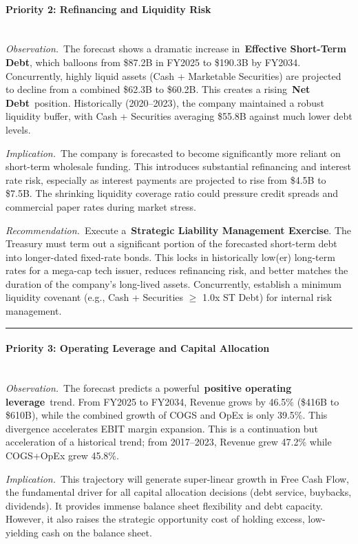 \documentclass[12pt,a4paper]{article}
\begin{document}
\begin{llmoutput}
\paragraph{Priority 2: Refinancing and Liquidity Risk}\mbox{}\\
\textit{Observation.}~The forecast shows a dramatic increase
in~\textbf{Effective Short-Term Debt}, which balloons from \$87.2B in
FY2025 to \$190.3B by FY2034. Concurrently, highly liquid assets (Cash +
Marketable Securities) are projected to decline from a combined \$62.3B
to \$60.2B. This creates a rising~\textbf{Net Debt}~position.
Historically (2020--2023), the company maintained a robust liquidity
buffer, with Cash + Securities averaging \$55.8B against much lower debt
levels.

\textit{Implication.}~The company is forecasted to become significantly
more reliant on short-term wholesale funding. This introduces
substantial refinancing and interest rate risk, especially as interest
payments are projected to rise from \$4.5B to \$7.5B. The shrinking
liquidity coverage ratio could pressure credit spreads and commercial
paper rates during market stress.

\textit{Recommendation.}~Execute a~\textbf{Strategic Liability
Management Exercise}. The Treasury must term out a significant portion
of the forecasted short-term debt into longer-dated fixed-rate bonds.
This locks in historically low(er) long-term rates for a mega-cap tech
issuer, reduces refinancing risk, and better matches the duration of the
company's long-lived assets. Concurrently, establish a
minimum liquidity covenant (e.g., Cash + Securities $\geq$ 1.0x ST Debt) for
internal risk management.

\noindent\rule{\linewidth}{0.3pt}

\paragraph{Priority 3: Operating Leverage and Capital Allocation}\mbox{}\\
\textit{Observation.}~The forecast predicts a powerful~\textbf{positive
operating leverage}~trend. From FY2025 to FY2034, Revenue grows by
46.5\% (\$416B to \$610B), while the combined growth of COGS and OpEx is
only 39.5\%. This divergence accelerates EBIT margin expansion. This is
a continuation but acceleration of a historical trend; from 2017--2023,
Revenue grew 47.2\% while COGS+OpEx grew 45.8\%.

\textit{Implication.}~This trajectory will generate super-linear growth
in Free Cash Flow, the fundamental driver for all capital allocation
decisions (debt service, buybacks, dividends). It provides immense
balance sheet flexibility and debt capacity. However, it also raises the
strategic opportunity cost of holding excess, low-yielding cash on the
balance sheet.


\end{llmoutput}
\end{document}
